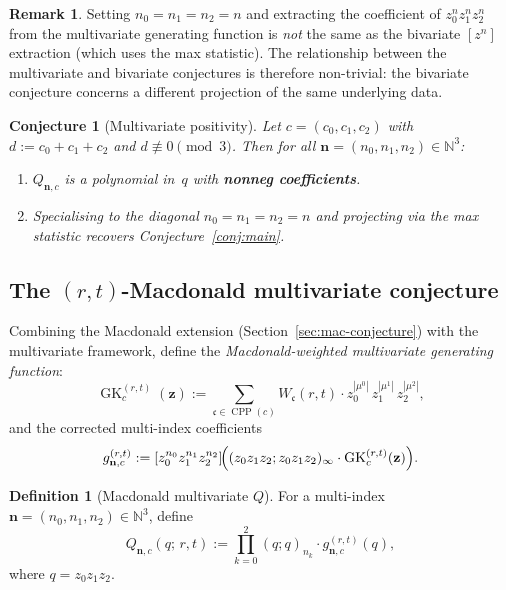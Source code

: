 \documentclass[11pt]{article}
\theoremstyle{plain}
\newtheorem{conjecture}[theorem]{Conjecture}
\theoremstyle{definition}
\newtheorem{definition}[theorem]{Definition}
\newtheorem{remark}[theorem]{Remark}
\newcommand{\N}{\mathbb{N}}
\newcommand{\GK}{\operatorname{GK}}
\newcommand{\CPP}{\operatorname{CPP}}
\newcommand{\qpoch}[2]{(#1;#2)_\infty}
\newcommand{\qpochn}[3]{(#1;#2)_{#3}}
\begin{document}
\begin{remark}
Setting $n_0 = n_1 = n_2 = n$ and extracting the coefficient of
$z_0^n z_1^n z_2^n$ from the multivariate generating function is
\emph{not} the same as the bivariate $[z^n]$ extraction (which
uses the max statistic).  The relationship between the multivariate
and bivariate conjectures is therefore non-trivial: the bivariate
conjecture concerns a different projection of the same
underlying data.
\end{remark}

\begin{conjecture}[Multivariate positivity]
\label{conj:multi}
Let $c = (c_0, c_1, c_2)$ with $d := c_0 + c_1 + c_2$ and
$d \not\equiv 0 \pmod{3}$.  Then for all
$\mathbf{n} = (n_0, n_1, n_2) \in \N^3$:
\begin{enumerate}
  \item[(i)] $Q_{\mathbf{n},c}$ is a polynomial in~$q$ with
    \textbf{nonneg coefficients}.
  \item[(ii)] Specialising to the diagonal $n_0 = n_1 = n_2 = n$
    and projecting via the max statistic recovers
    Conjecture~\ref{conj:main}.
\end{enumerate}
\end{conjecture}

\subsection{The $(r,t)$-Macdonald multivariate conjecture}

Combining the Macdonald extension (Section~\ref{sec:mac-conjecture})
with the multivariate framework, define the
\emph{Macdonald-weighted multivariate generating function}:
\[
  \GK_c^{(r,t)}(\mathbf{z})
  := \sum_{\mathfrak{c} \in \CPP(c)}
  W_{\mathfrak{c}}(r,t) \cdot
  z_0^{|\mu^0|}\, z_1^{|\mu^1|}\, z_2^{|\mu^2|},
\]
and the corrected multi-index coefficients
\begin{equation}
  g_{\mathbf{n},c}^{(r,t)}
  := [z_0^{n_0} z_1^{n_1} z_2^{n_2}]\!\Bigl(
    \qpoch{z_0 z_1 z_2}{z_0 z_1 z_2} \cdot
    \GK_c^{(r,t)}(\mathbf{z})
  \Bigr).
  \label{eq:gn-multi-rt}
\end{equation}

\begin{definition}[Macdonald multivariate $Q$]
\label{def:Q-multi-rt}
For a multi-index $\mathbf{n} = (n_0, n_1, n_2) \in \N^3$, define
\begin{equation}
  Q_{\mathbf{n},c}(q;\,r,t)
  := \prod_{k=0}^{2} \qpochn{q}{q}{n_k}
  \cdot g_{\mathbf{n},c}^{(r,t)}(q),
  \label{eq:Q-multi-rt}
\end{equation}
where $q = z_0 z_1 z_2$.
\end{definition}
\end{document}
